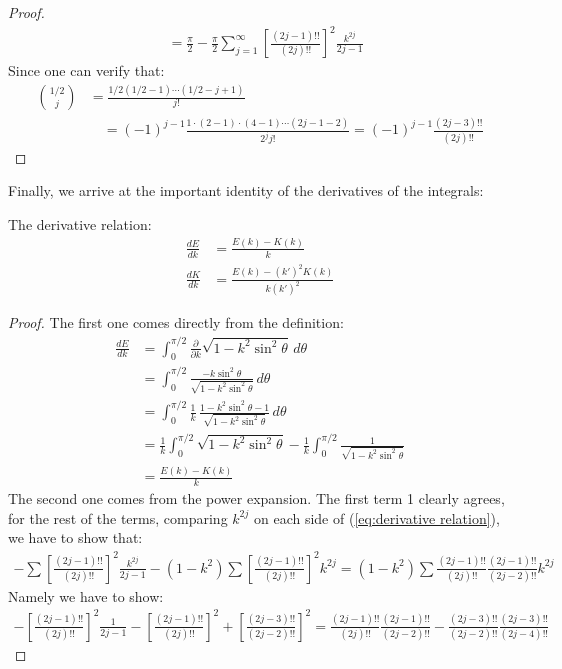 \documentclass{report}
\begin{document}
\begin{titlepage}
\begin{proof}
\begin{align*}
&=\frac{\pi}{2}-\frac{\pi}{2}\sum_{j=1}^{\infty}\left[\frac{(2j-1)!!}{(2j)!!}\right]^2\frac{k^{2j}}{2j-1}
\end{align*}
Since one can verify that:
\begin{align*}
{1/2\choose j}&=\frac{1/2(1/2-1)\cdots(1/2-j+1)}{j!}\\
&\quad=(-1)^{j-1} \frac{1\cdot(2-1)\cdot(4-1)\cdots(2j-1-2)}{2^jj!}=(-1)^{j-1}\frac{(2j-3)!!}{(2j)!!}
\end{align*}
\end{proof}
Finally, we arrive at the important identity of the derivatives of the integrals:
\begin{T}\label{thm:der} {\rm\cite{Borwein:1987aa}}The derivative relation:
\begin{align}
\frac{dE}{dk}&=\frac{E(k)-K(k)}{k}\\
\frac{dK}{dk}&=\frac{E(k)-(k')^2K(k)}{k(k')^2}\label{eq:derivative relation}
\end{align}
\end{T}
\begin{proof}
The first one comes directly from the definition\cite{Borwein:1987aa}:
\begin{align*}
\frac{dE}{dk}&=\int_0^{\pi/2}\frac{\partial }{\partial k}\sqrt{1-k^2\sin^2\theta}\,d\theta\\
&=\int_0^{\pi/2}\frac{-k\sin^2\theta}{\sqrt{1-k^2\sin^2\theta}}\,d\theta\\
&=\int_0^{\pi/2}\frac{1}{k}\,\frac{1-k^2\sin^2\theta-1}{\sqrt{1-k^2\sin^2\theta}}\,d\theta\\
&=\frac{1}{k}\int_0^{\pi/2}\sqrt{1-k^2\sin^2\theta}-\frac{1}{k}\int_0^{\pi/2}\frac{1}{\sqrt{1-k^2\sin^2\theta}}\\
&=\frac{E(k)-K(k)}{k}
\end{align*}
The second one comes from the power expansion\cite{Borwein:1987aa}\cite{Wernicke:1904aa}. The first term 1 clearly agrees, for the rest of the terms, comparing $k^{2j}$ on each side of (\ref{eq:derivative relation}), we have to show that:
\begin{align*}
-\sum\left[\frac{(2j-1)!!}{(2j)!!}\right]^2\frac{k^{2j}}{2j-1}
-(1-k^2)\sum\left[\frac{(2j-1)!!}{(2j)!!}\right]^2k^{2j}=(1-k^2)\sum\frac{(2j-1)!!}{(2j)!!}\frac{(2j-1)!!}{(2j-2)!!}k^{2j}
\end{align*}
Namely we have to show:
\begin{align*}
-\left[\frac{(2j-1)!!}{(2j)!!}\right]^2\frac{1}{2j-1}
-\left[\frac{(2j-1)!!}{(2j)!!}\right]^2+\left[\frac{(2j-3)!!}{(2j-2)!!}\right]^2=\frac{(2j-1)!!}{(2j)!!}\frac{(2j-1)!!}{(2j-2)!!}-\frac{(2j-3)!!}{(2j-2)!!}\frac{(2j-3)!!}{(2j-4)!!}

\end{align*}
\end{proof}
\end{titlepage}
\end{document}
